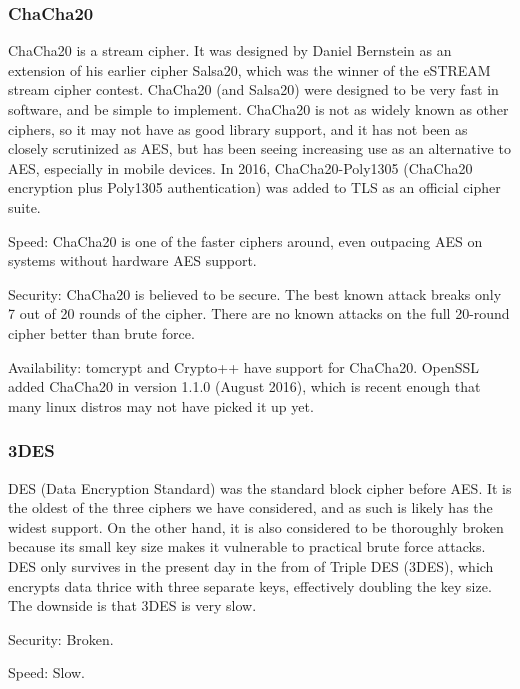 \documentclass[onecolumn, draftclsnofoot,10pt, compsoc]{IEEEtran}
\begin{document}
\subsubsection{ ChaCha20 }

ChaCha20 \cite{chacha} is a stream cipher. It was designed by Daniel Bernstein as an extension of his earlier cipher Salsa20, which was the winner of the eSTREAM stream cipher contest.
ChaCha20 (and Salsa20) were designed to be very fast in software, and be simple to implement.
ChaCha20 is not as widely known as other ciphers, so it may not have as good library support, and it has not been as closely scrutinized as AES, but has been seeing increasing use as an alternative to AES, especially in mobile devices. In 2016, ChaCha20-Poly1305 (ChaCha20 encryption plus Poly1305 authentication) was added to TLS as an official cipher suite. \cite{rfc7905}

Speed: ChaCha20 is one of the faster ciphers around, even outpacing AES on systems without hardware AES support. \cite{eBACS}

Security: ChaCha20 is believed to be secure. The best known attack breaks only 7 out of 20 rounds of the cipher. There are no known attacks on the full 20-round cipher better than brute force.

Availability: tomcrypt and Crypto++ have support for ChaCha20. OpenSSL added ChaCha20 in version 1.1.0 (August 2016), which is recent enough that many linux distros may not have picked it up yet.

\subsubsection{ 3DES }

DES (Data Encryption Standard) was the standard block cipher before AES. It is the oldest of the three ciphers we have considered, and as such is likely has the widest support. On the other hand, it is also considered to be thoroughly broken because its small key size makes it vulnerable to practical brute force attacks. DES only survives in the present day in the from of Triple DES (3DES), which encrypts data thrice with three separate keys, effectively doubling the key size. The downside is that 3DES is very slow.

Security: Broken.

Speed: Slow.
\end{document}
